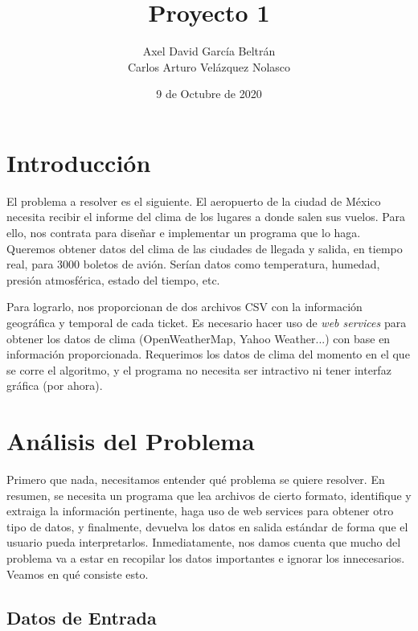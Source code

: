 \documentclass[11 pt]{article}
\title{Proyecto 1}
\author{
		Axel David García Beltrán \\ Carlos Arturo Velázquez Nolasco
	}
\date{9 de Octubre de 2020}
\theoremstyle{remark}
\begin{document}
\begin{titlepage}
	\maketitle
\end{titlepage}

\tableofcontents

\newpage

\section{Introducción}
	
	El problema a resolver es el siguiente. El aeropuerto de la ciudad de México necesita recibir el informe del clima de los lugares a donde salen sus vuelos. Para ello, nos contrata para diseñar e implementar un programa que lo haga. Queremos obtener datos del clima de las ciudades de llegada y salida, en tiempo real, para 3000 boletos de avión. Serían datos como temperatura, humedad, presión atmosférica, estado del tiempo, etc.
	
	Para lograrlo, nos proporcionan de dos archivos CSV con la información geográfica y temporal de cada ticket. Es necesario hacer uso de \emph{web services} para obtener los datos de clima (OpenWeatherMap, Yahoo Weather...) con base en información proporcionada. Requerimos los datos de clima del momento en el que se corre el algoritmo, y el programa no necesita ser intractivo ni tener interfaz gráfica (por ahora). 
		
		
		
\section{Análisis del Problema}

	Primero que nada, necesitamos entender qué problema se quiere resolver. En resumen, se necesita un programa que lea archivos de cierto formato, identifique y extraiga la información pertinente, haga uso de web services para obtener otro tipo de datos, y finalmente, devuelva los datos en salida estándar de forma que el usuario pueda interpretarlos. Inmediatamente, nos damos cuenta que mucho del problema va a estar en recopilar los datos importantes e ignorar los innecesarios. Veamos en qué consiste esto.
	
	
	\subsection{Datos de Entrada}
	
\end{document}

